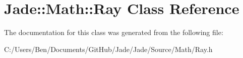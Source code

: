 \hypertarget{class_jade_1_1_math_1_1_ray}{}\section{Jade\+:\+:Math\+:\+:Ray Class Reference}
\label{class_jade_1_1_math_1_1_ray}


The documentation for this class was generated from the following file\+:\begin{DoxyCompactItemize}
\item 
C\+:/\+Users/\+Ben/\+Documents/\+Git\+Hub/\+Jade/\+Jade/\+Source/\+Math/Ray.\+h\end{DoxyCompactItemize}
